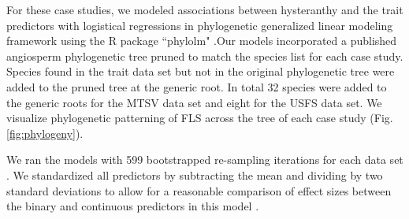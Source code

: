 \documentclass[12pt]{article}\usepackage[]{graphicx}\usepackage[]{color}
\begin{document}
\noindent For these case studies, we modeled associations between hysteranthy and the trait predictors with logistical regressions in phylogenetic generalized linear modeling framework \citep{Ives2010} using the R package ``phylolm" \citep{Ho2014}.Our models incorporated a published angiosperm phylogenetic tree \citep{Zanne2013} pruned to match the species list for each case study. Species found in the trait data set but not in the original phylogenetic tree were added to the pruned tree at the generic root. In total 32 species were added to the generic roots for the MTSV data set and eight for the USFS data set. We visualize phylogenetic patterning of FLS across the tree of each case study (Fig. \ref{fig:phylogeny}).

\noindent We ran the models with 599 bootstrapped re-sampling iterations for each data set \citep{Wilcox2010}. We standardized all predictors by subtracting the mean and dividing by two standard deviations to allow for a reasonable comparison of effect sizes between the binary and continuous predictors in this model \citep{Gelman2007}. 
\end{document}
